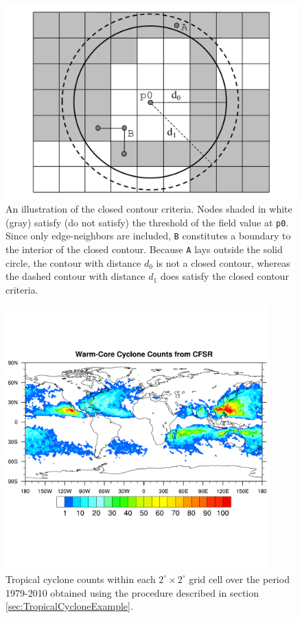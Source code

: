 \documentclass[gmdd, hvmath, online]{copernicus_discussions}
\begin{document}
\begin{figure}[H]
\begin{center}
\includegraphics[width=5in]{ClosedContourCriteria2.pdf}
\end{center}
\caption{An illustration of the closed contour criteria.  Nodes shaded in white (gray) satisfy (do not satisfy) the threshold of the field value at \texttt{p0}.  Since only edge-neighbors are included, \texttt{B} constitutes a boundary to the interior of the closed contour.  Because \texttt{A} lays outside the solid circle, the contour with distance $d_0$ is not a closed contour, whereas the dashed contour with distance $d_1$ does satisfy the closed contour criteria.} \label{fig:ClosedContour}
\end{figure}

\begin{figure}[H]
\begin{center}
\includegraphics[width=4in, clip, trim=0.2cm 3.6cm 0.2cm 3.1cm]{plot-cfsr_tc_density.pdf}
\end{center}
\caption{Tropical cyclone counts within each $2^\circ \times 2^\circ$ grid cell over the period 1979-2010 obtained using the procedure described in section \ref{sec:TropicalCycloneExample}.} \label{fig:TropicalCycloneDensity}
\end{figure}
\end{document}
